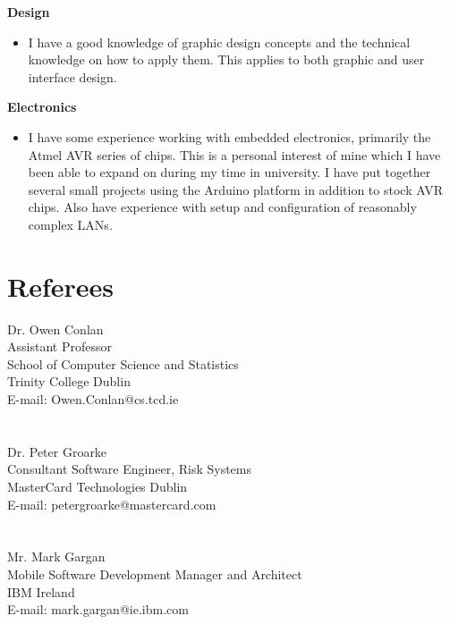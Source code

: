 \documentclass{res}
\begin{document}
\begin{resume}
  {\bf Design} 
        \begin{itemize}
        \item[] I have a good knowledge of graphic design concepts and the technical knowledge on how to apply them. This applies to both graphic and user interface design.
       \end{itemize}

   {\bf  Electronics} 
        \begin{itemize}
        \item[]  I have some experience working with embedded electronics, primarily the Atmel AVR series of chips. This is a personal interest of mine which I have been able to expand on during my time in university. I have put together several small projects using the Arduino platform in addition to stock AVR chips. Also have experience with setup and configuration of reasonably complex LANs.
       \end{itemize} 

 
\section{Referees}
\vspace{0.1in} 
 
   Dr. Owen Conlan\\
   Assistant Professor\\
   School of Computer Science and Statistics\\
   Trinity College Dublin\\
   E-mail: Owen.Conlan@cs.tcd.ie\\
   \\
   \\
   Dr. Peter Groarke\\
   Consultant Software Engineer, Risk Systems\\
   MasterCard Technologies Dublin\\
   E-mail: peter\textunderscore groarke@mastercard.com\\
   \\
   \\
   Mr. Mark Gargan\\
   Mobile Software Development Manager and Architect\\
   IBM Ireland\\
   E-mail: mark.gargan@ie.ibm.com



    
 

\end{resume}
\end{document}
